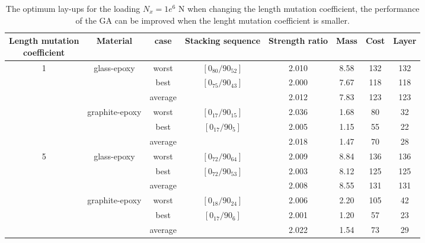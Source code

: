 \begin{table*}
\caption{The optimum lay-ups for the loading $N_x=1e^6$ N when changing the
length mutation coefficient, the performance of the GA can be improved
when the lenght mutation coefficient is smaller.} \centering
\begin{adjustbox}{width=1\textwidth}
	\begin{tabular}{cccccccc}
	\toprule
	\makecell{Length mutation \\ coefficient}		     &	 Material		               	 & case     & Stacking sequence    & Strength ratio  & Mass  &  Cost   & Layer    \\ 
	\midrule																															  
	\multirow{6}{*}{1} &	\multirow{3}{*}{glass-epoxy}   	 & worst     &  $[0_{80}/90_{52}]$ & 2.010           &  8.58  & 132     & 132   \\
						 &								     & best      &  $[0_{75}/90_{43}]$ & 2.000           &  7.67  & 118     & 118  \\
					     &									 & average   &    		           & 2.012           &  7.83  & 123     & 123  \\
						 &	\multirow{3}{*}{graphite-epoxy}	 & worst     &  $[0_{17}/90_{15}]$ & 2.036           & 1.68   & 80      & 32      \\
					     &								     & best      &  $[0_{17}/90_{5}]$  & 2.005           & 1.15   & 55      & 22      \\
					     &								     & average   &                     & 2.018           & 1.47   & 70      & 28      \\
	\multirow{6}{*}{5} &	\multirow{3}{*}{glass-epoxy}   	 & worst     &  $[0_{72}/90_{64}]$ &  2.009          & 8.84   &  136    &  136   \\
						 &								     & best      &  $[0_{72}/90_{53}]$ &  2.003          & 8.12   &  125    &  125   \\
					     &									 & average   &                     &  2.008          & 8.55   &  131    &  131  \\
						 &	\multirow{3}{*}{graphite-epoxy}	 & worst     &  $[0_{18}/90_{24}]$ &  2.006          & 2.20   &  105    &  42  \\
					     &								     & best      &  $[0_{17}/90_{6}]$  &  2.001          & 1.20   &  57     &  23  \\
					     &								     & average   &                    &   2.022          & 1.54   &  73     &  29  \\
	\bottomrule																															  
\end{tabular}
\end{adjustbox}
\label{tab:optimum_layup}
\end{table*}
            
            

